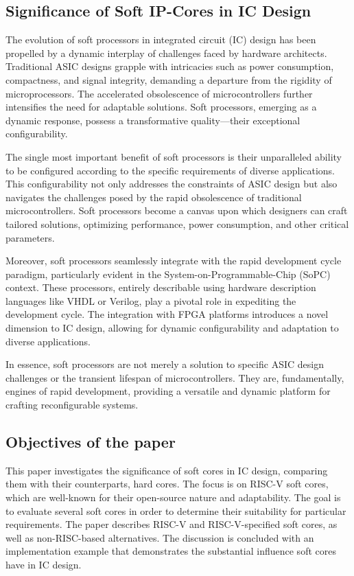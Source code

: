 \documentclass[conference]{IEEEtran}
\begin{document}
\subsection{Significance of Soft IP-Cores in IC Design}
The evolution of soft processors in integrated circuit (IC) design has been propelled by a dynamic interplay of challenges faced by hardware architects. Traditional ASIC designs grapple with intricacies such as power consumption, compactness, and signal integrity, demanding a departure from the rigidity of microprocessors. The accelerated obsolescence of microcontrollers further intensifies the need for adaptable solutions. Soft processors, emerging as a dynamic response, possess a transformative quality—their exceptional configurability.

The single most important benefit of soft processors is their unparalleled ability to be configured according to the specific requirements of diverse applications. This configurability not only addresses the constraints of ASIC design but also navigates the challenges posed by the rapid obsolescence of traditional microcontrollers. Soft processors become a canvas upon which designers can craft tailored solutions, optimizing performance, power consumption, and other critical parameters.

Moreover, soft processors seamlessly integrate with the rapid development cycle paradigm, particularly evident in the System-on-Programmable-Chip (SoPC) context. These processors, entirely describable using hardware description languages like VHDL or Verilog, play a pivotal role in expediting the development cycle. The integration with FPGA platforms introduces a novel dimension to IC design, allowing for dynamic configurability and adaptation to diverse applications.

In essence, soft processors are not merely a solution to specific ASIC design challenges or the transient lifespan of microcontrollers. They are, fundamentally, engines of rapid development, providing a versatile and dynamic platform for crafting reconfigurable systems. 
\subsection{Objectives of the paper}
This paper investigates the significance of soft cores in IC design, comparing them with their counterparts, hard cores. The focus is on RISC-V soft cores, which are well-known for their open-source nature and adaptability. The goal is to evaluate several soft cores in order to determine their suitability for particular requirements. The paper describes RISC-V and RISC-V-specified soft cores, as well as non-RISC-based alternatives. The discussion is concluded with an implementation example that demonstrates the substantial influence soft cores have in IC design.
\end{document}
